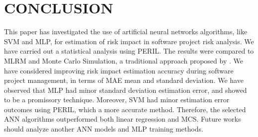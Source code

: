 \documentclass[a4paper,twoside]{article}
\begin{document}
\section{\uppercase{Conclusion}}
\label{sec:conclusion}

\noindent This paper has investigated the use of artificial neural networks algorithms, like SVM and MLP, for estimation of risk impact in software project risk analysis. We have carried out a statistical analysis using PERIL. The results were compared to MLRM and Monte Carlo Simulation, a traditional approach proposed by \cite{PMBOK2008}. We have considered improving risk impact estimation accuracy during software project management, in terms of MAE mean and standard deviation. We have observed that MLP had minor standard deviation estimation error, and showed to be a promissory technique. Moreover, SVM had minor estimation error outcomes using PERIL, which a more accurate method. Therefore, the selected ANN algorithms outperformed both linear regression and MCS. Future works should analyze another ANN models and MLP training methods.


{\small
}

\vfill
\end{document}
